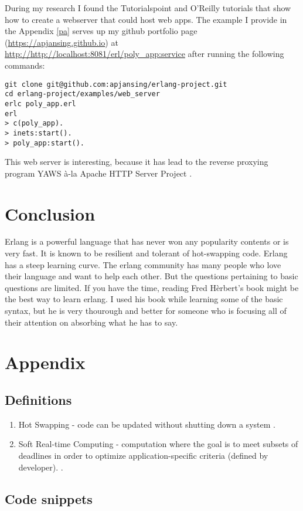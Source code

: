 \documentclass[11 pt]{IEEEtran}
\begin{document}
During my research I found the Tutorialspoint and O'Reilly tutorials that show how to create a webserver that could host web apps. The example I provide in the Appendix \ref{pa} serves up my github portfolio page (\url{https://apjansing.github.io}) at \url{http://http://localhost:8081/erl/poly_app:service} after running the following commands:
\begin{lstlisting}
git clone git@github.com:apjansing/erlang-project.git
cd erlang-project/examples/web_server
erlc poly_app.erl
erl
> c(poly_app).
> inets:start().
> poly_app:start().
\end{lstlisting}
This web server is interesting, because it has lead to the reverse proxying program YAWS\cite{yaws} \`a-la Apache HTTP Server Project \cite{apache-httpd}.

\section{Conclusion}
Erlang is a powerful language that has never won any popularity contents or is very fast. It is known to be resilient and tolerant of hot-swapping code\cite{wiki}. Erlang has a steep learning curve. The erlang community has many people who love their language and want to help each other. But the questions pertaining to basic questions are limited. If you have the time, reading Fred H\`erbert's book might be the best way to learn erlang\cite{herbert}. I used his book while learning some of the basic syntax, but he is very thourough and better for someone who is focusing all of their attention on absorbing what he has to say.

\section{Appendix}
\subsection{Definitions}\label{definitions}
\begin{enumerate}
\item  Hot Swapping - code can be updated without shutting down a system \cite{wiki}.
\item Soft Real-time Computing - computation where the goal is to meet subsets of deadlines in order to optimize application-specific criteria (defined by developer). \cite{soft-rt}.
\end{enumerate}
 
\subsection{Code snippets}\label{code-snippets}
\end{document}

